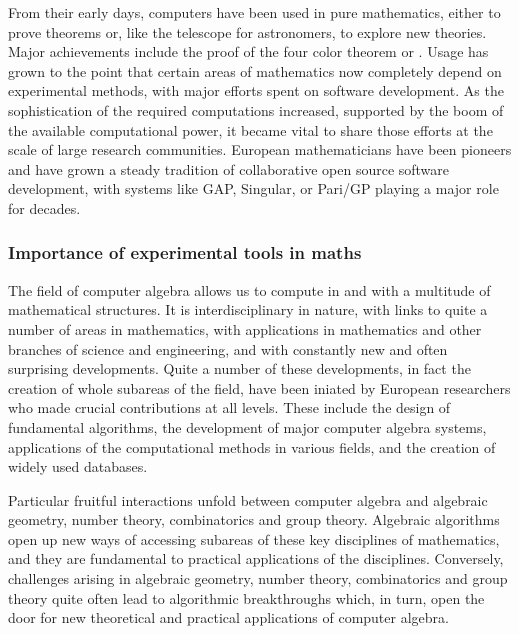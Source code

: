 \documentclass[a4paper,11pt]{article}
\begin{document}

From their early days, computers have been used in pure mathematics,
either to prove theorems or, like the telescope for astronomers, to
explore new theories. Major achievements include the proof of the four
color theorem or . Usage has grown to the
point that certain areas of mathematics now completely depend on
experimental methods, with major efforts spent on software
development. As the sophistication of the required computations
increased, supported by the boom of the available computational power,
it became vital to share those efforts at the scale of large research
communities. European mathematicians have been pioneers and have grown
a steady tradition of collaborative open source software development,
with systems like GAP, Singular, or Pari/GP playing a major role for
decades.

\subsubsection{Importance of experimental tools in maths}


The field of computer algebra allows us to compute in and with a multitude
of mathematical structures. It is interdisciplinary in nature, with links to quite
a number of areas in mathematics, with applications in mathematics and other
branches of science and engineering, and with constantly new and often
surprising developments. Quite a number of these developments, in fact the
creation of whole subareas of the field,  have been iniated by European
researchers who made crucial contributions at all levels. These include the
design of fundamental algorithms, the development of major computer
algebra systems, applications of the computational methods in various fields,
and the creation of widely used databases.

Particular fruitful interactions unfold between computer algebra and
algebraic geometry, number theory, combinatorics and group theory. Algebraic algorithms
open up new ways of accessing subareas of these key disciplines of
mathematics, and they are fundamental to practical applications of the
disciplines. Conversely, challenges arising in algebraic geometry, number
theory, combinatorics and group theory quite often lead to algorithmic breakthroughs
which, in turn, open the door for new theoretical and practical applications
of computer algebra.
\end{document}
